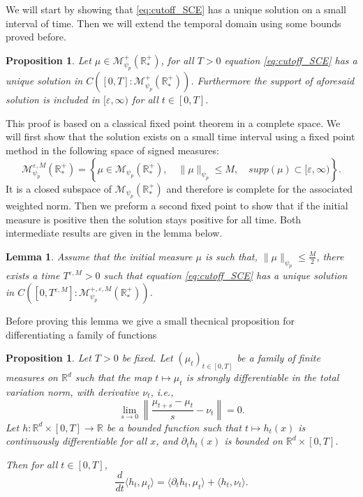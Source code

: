 \documentclass[11pt,a4paper]{article}
\newcommand{\RRP}{\mathbb{R}^+_*}
\newcommand{\MC}{\mathcal{M}}
\newtheorem{lemma}[theorem]{Lemma}
\newtheorem{proposition}[theorem]{Proposition}
\begin{document}
We will start by showing that \eqref{eq:cutoff_SCE} has a unique solution on a small interval of time. Then we will extend the temporal domain using some  bounds proved before.
\begin{proposition}\label{prop:well-posedness-cutoff-smol}
    Let $\mu \in \MC^+_{\psi_p}(\RRP)$, for all $T > 0$ equation \eqref{eq:cutoff_SCE} has a unique solution in $C\left([0,T]:\MC^+_{\psi_p}(\RRP)\right)$. Furthermore the support of aforesaid solution is included in $[\varepsilon,\infty)$ for all $t \in [0,T]$.
\end{proposition}

This proof is based on a classical fixed point theorem in a complete space. We will first show that the solution exists on a small time interval using a fixed point method in the following space of signed measures:
    \[ \MC^{\varepsilon,M}_{\psi_p}(\RRP) = \left\lbrace \mu \in \MC_{\psi_p}(\RRP) ,\quad \|\mu \|_{\psi_p}\leq M,\quad supp(\mu) \subset [\varepsilon,\infty)\right\rbrace. \]
It is a closed subspace of $\MC_{\psi_p}(\RRP)$ and therefore is complete for the associated weighted norm. Then we preform a second fixed point to show that if the initial measure is positive then the solution stays positive for all time. Both intermediate results are given in the lemma below. 
\begin{lemma}\label{lem:fixed-point-1}
    Assume that the initial measure $\mu$ is such that, $\| \mu\|_{\psi_p} \leq \frac{M}{2}$, there exists a time $T^{\varepsilon,M} > 0$ such that equation \eqref{eq:cutoff_SCE} has a unique solution in $C\left([0,T^{\varepsilon,M}]:\MC^{+,\varepsilon,M}_{\psi_p}(\RRP)\right)$. 
\end{lemma}
Before proving this lemma we give a small thecnical proposition for differentiating a family of functions
\begin{proposition}
    Let $T > 0$ be fixed. Let $\left(\mu_t \right)_{t \in [0,T]}$ be a family of finite measures on $\mathbb{R}^d$ such that the map $t \mapsto \mu_t$ is strongly differentiable in the total variation norm, with derivative $\nu_t$, i.e.,
    \[
    \lim_{s \to 0} \left\| \frac{\mu_{t+s} - \mu_t}{s} - \nu_t \right\| = 0.
    \]
    Let $h : \mathbb{R}^d \times [0,T] \to \mathbb{R}$ be a bounded function such that $t \mapsto h_t(x)$ is continuously differentiable for all $x$, and $\partial_t h_t(x)$ is bounded on $\mathbb{R}^d \times [0,T]$.
    
    Then for all $t \in [0,T]$,
    \[
    \frac{d}{dt} \langle h_t, \mu_t \rangle = \langle \partial_t h_t, \mu_t \rangle + \langle h_t, \nu_t \rangle.
    \]
    \end{proposition}
    
\end{document}
